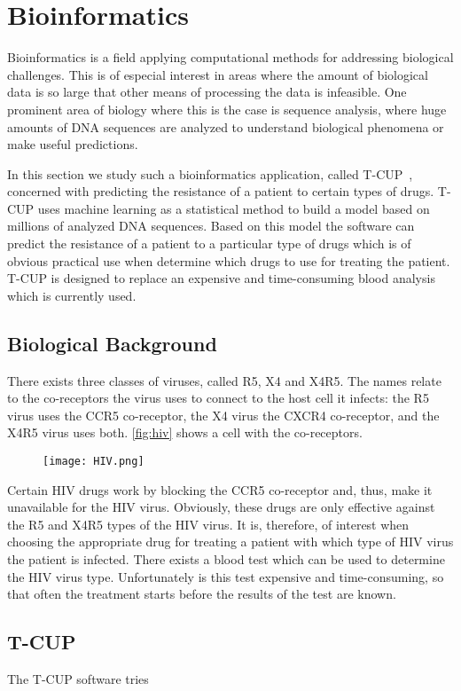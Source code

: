 \section{Bioinformatics}
\label{sec:bioinfo}

Bioinformatics is a field applying computational methods for addressing biological challenges.
This is of especial interest in areas where the amount of biological data is so large that other means of processing the data is infeasible.
One prominent area of biology where this is the case is sequence analysis, where huge amounts of DNA sequences are analyzed to understand biological phenomena or make useful predictions.

In this section we study such a bioinformatics application, called T-CUP~\cite{DybowskiHeHo2010}, concerned with predicting the resistance of a patient to certain types of \HIV drugs.
T-CUP uses machine learning as a statistical method to build a model based on millions of analyzed DNA sequences.
Based on this model the software can predict the resistance of a patient to a particular type of \HIV drugs which is of obvious practical use when determine which drugs to use for treating the patient.
T-CUP is designed to replace an expensive and time-consuming blood analysis which is currently used.

\subsection*{Biological Background}
There exists three classes of \HIV viruses, called R5, X4 and X4R5.
The names relate to the co-receptors the virus uses to connect to the host cell it infects:
the R5 virus uses the {\small CCR5} co-receptor, the X4 virus the {\small CXCR4} co-receptor, and the X4R5 virus uses both.
\autoref{fig:hiv} shows a cell with the co-receptors.
\begin{figure}[t]
  \centering
  \texttt{[image: HIV.png]}
  \caption[]%
          {}
  \label{fig:hiv}
\end{figure}
Certain HIV drugs work by blocking the {\small CCR5} co-receptor and, thus, make it unavailable for the HIV virus.
Obviously, these drugs are only effective against the R5 and X4R5 types of the HIV virus.
It is, therefore, of interest when choosing the appropriate drug for treating a patient with which type of HIV virus the patient is infected.
There exists a blood test which can be used to determine the HIV virus type.
Unfortunately is this test expensive and time-consuming, so that often the treatment starts before the results of the test are known.

\subsection*{T-CUP}
The T-CUP software tries

